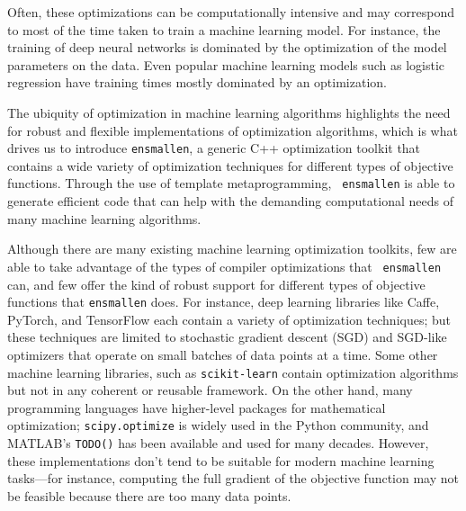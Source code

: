 \documentclass{article}
\begin{document}
Often, these optimizations can be computationally intensive and may correspond
to most of the time taken to train a machine learning model.  For instance, the
training of deep neural networks is dominated by the optimization of the model
parameters on the data. %
Even popular machine learning models such as logistic regression %
have training times mostly dominated by an optimization.
%

The ubiquity of optimization in machine learning algorithms highlights the need
for robust and flexible implementations of optimization algorithms, which is
what drives us to introduce {\tt ensmallen}, a generic C++ optimization toolkit
that contains a wide variety of optimization techniques for different types of
objective functions.  Through the use of template metaprogramming, {\tt
ensmallen} is able to generate efficient code that can help with the
demanding computational needs of many machine learning algorithms.

Although there are many existing machine learning optimization toolkits, few
are able to take advantage of the types of compiler optimizations that {\tt
ensmallen} can, and few offer the kind of robust support for different types of
objective functions that {\tt ensmallen} does.  For instance, deep learning
libraries like Caffe, %
PyTorch, %
and TensorFlow %
each contain a variety of optimization techniques; but these techniques are
limited to stochastic gradient descent (SGD) and SGD-like optimizers that
operate on small batches of data points at a time.  Some other machine learning
libraries, such as {\tt scikit-learn} %
contain optimization algorithms but not in any coherent or reusable framework.
On the other hand, many programming languages have higher-level packages for
mathematical optimization; {\tt scipy.optimize} %
is widely used in the Python community, and MATLAB's {\tt TODO()}
has been available and used for many decades.  However, these implementations
don't tend to be suitable for modern machine learning tasks---for instance,
computing the full gradient of the objective function may not be feasible
because there are too many data points.
\end{document}
